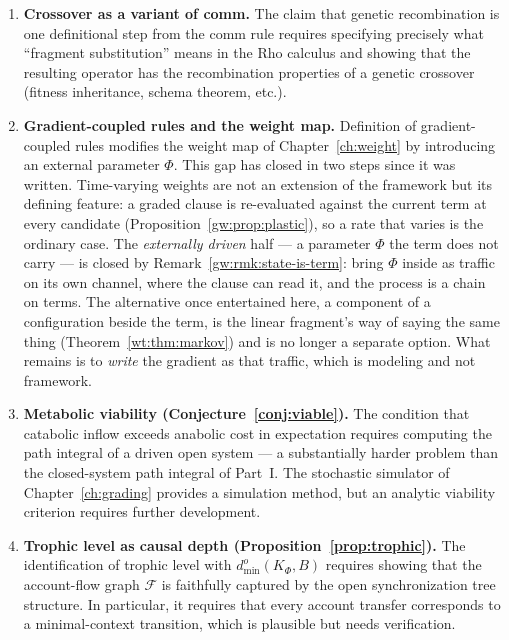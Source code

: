\begin{enumerate}[label=\textbf{Gap \arabic*.}, leftmargin=*, itemsep=8pt]
  \item \textbf{Crossover as a variant of comm.}
        The claim that genetic recombination is one definitional
        step from the comm rule requires specifying precisely what
        ``fragment substitution'' means in the Rho calculus and
        showing that the resulting operator has the recombination
        properties of a genetic crossover (fitness inheritance,
        schema theorem, etc.).

  \item \textbf{Gradient-coupled rules and the weight map.}
        Definition of gradient-coupled rules modifies the weight
        map of Chapter~\ref{ch:weight} by introducing an external
        parameter $\Phi$.
        This gap has closed in two steps since it was written.
        Time-varying weights are not an extension of the framework
        but its defining feature: a graded clause is re-evaluated
        against the current term at every candidate
        (Proposition~\ref{gw:prop:plastic}), so a rate that varies is
        the ordinary case.
        The \emph{externally driven} half --- a parameter $\Phi$ the
        term does not carry --- is closed by
        Remark~\ref{gw:rmk:state-is-term}: bring $\Phi$ inside as
        traffic on its own channel, where the clause can read it, and
        the process is a chain on terms.  The alternative once
        entertained here, a component of a configuration beside the
        term, is the linear fragment's way of saying the same thing
        (Theorem~\ref{wt:thm:markov}) and is no longer a separate
        option.  What remains is to \emph{write} the gradient as that
        traffic, which is modeling and not framework.

  \item \textbf{Metabolic viability (Conjecture~\ref{conj:viable}).}
        The condition that catabolic inflow exceeds anabolic cost
        in expectation requires computing the path integral of a
        driven open system --- a substantially harder problem than
        the closed-system path integral of Part~I.
        The stochastic simulator of Chapter~\ref{ch:grading}
        provides a simulation method, but an analytic viability
        criterion requires further development.

  \item \textbf{Trophic level as causal depth
        (Proposition~\ref{prop:trophic}).}
        The identification of trophic level with
        $d^o_{\min}(K_\Phi, B)$ requires showing that the
        account-flow graph $\mathcal{F}$ is faithfully captured
        by the open synchronization tree structure.
        In particular, it requires that every account transfer
        corresponds to a minimal-context transition, which is
        plausible but needs verification.


\end{enumerate}

